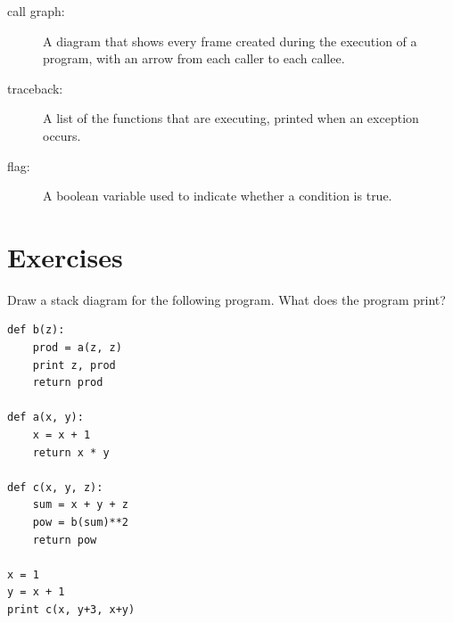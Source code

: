 \begin{description}
\item[call graph:] A diagram that shows every frame created during
the execution of a program, with an arrow from each caller to
each callee. 


\item[traceback:]  A list of the functions that are executing,
printed when an exception occurs.

\item[flag:] A boolean variable used to indicate whether a condition
is true.


\end{description}


\section{Exercises}

\begin{ex}

Draw a stack diagram for the following
program.  What does the program print?

\beforeverb
\begin{verbatim}
def b(z):
    prod = a(z, z)
    print z, prod
    return prod

def a(x, y):
    x = x + 1
    return x * y

def c(x, y, z):
    sum = x + y + z
    pow = b(sum)**2
    return pow

x = 1
y = x + 1
print c(x, y+3, x+y)
\end{verbatim}
\afterverb

\end{ex}



